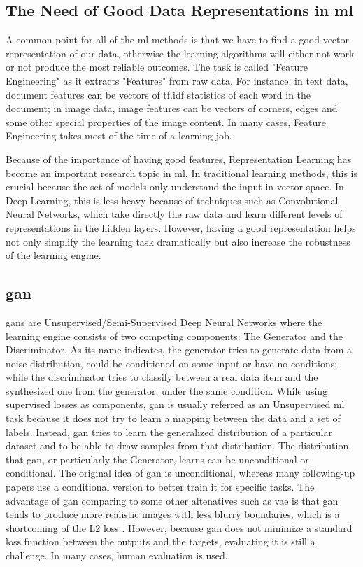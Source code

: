 \subsection{The Need of Good Data Representations in \acrshort{ml}}
A common point for all of the \acrshort{ml} methods is that we have to find a good vector
representation of our data, otherwise the learning algorithms will either not work or not
produce the most reliable outcomes. The task is called "Feature Engineering" as it
extracts "Features" from raw data. For instance, in text data, document features can be
vectors of tf.idf statistics of each word in the document; in image data, image features
can be vectors of corners, edges and some other special properties of the image content.
In many cases, Feature Engineering takes most of the time of a learning job.

Because of the importance of having good features, Representation Learning has become an
important research topic in \acrshort{ml}. In traditional learning methods, this is
crucial because the set of models only understand the input in vector space. In Deep
Learning, this is less heavy because of techniques such as Convolutional Neural Networks,
which take directly the raw data and learn different levels of representations in the
hidden layers. However, having a good representation helps not only simplify the learning
task dramatically but also increase the robustness of the learning engine.

\subsection{\acrfull{gan} \label{subsec:intro_gan}}
\acrlong{gan}s \cite{gan} are Unsupervised/Semi-Supervised Deep Neural Networks where the
learning engine consists of two competing components: The Generator and the Discriminator.
As its name indicates, the generator tries to generate data from a noise distribution,
could be conditioned on some input or have no conditions; while the discriminator tries to
classify between a real data item and the synthesized one from the generator, under the
same condition. While using supervised losses as components, \acrshort{gan} is usually
referred as an Unsupervised \acrshort{ml} task because it does not try to learn a mapping
between the data and a set of labels. Instead, \acrshort{gan} tries to learn the
generalized distribution of a particular dataset and to be able to draw samples from that
distribution. The distribution that \acrshort{gan}, or particularly the Generator, learns
can be unconditional or conditional. The original idea of \acrshort{gan} is unconditional,
whereas many following-up papers use a conditional version to better train it for specific
tasks. The advantage of \acrshort{gan} comparing to some other altenatives such as
\acrfull{vae} \cite{vae} is that \acrshort{gan} tends to produce more realistic images
with less blurry boundaries, which is a shortcoming of the L2 loss \cite{gan}.  However,
because \acrshort{gan} does not minimize a standard loss function between the outputs and
the targets, evaluating it is still a challenge. In many cases, human evaluation is used.

